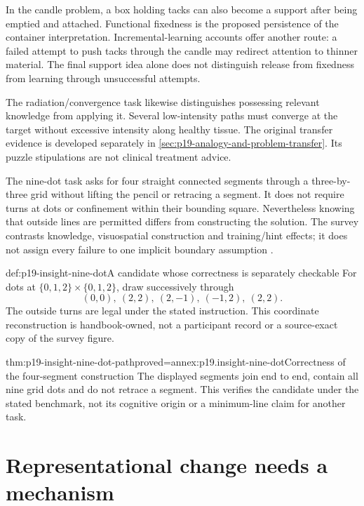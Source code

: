 In the candle problem, a box holding tacks can also become a support after
being emptied and attached. Functional fixedness is the proposed persistence
of the container interpretation. Incremental-learning accounts offer another
route: a failed attempt to push tacks through the candle may redirect attention
to thinner material. The final support idea alone does not distinguish release
from fixedness from learning through unsuccessful attempts.

The radiation/convergence task likewise distinguishes possessing relevant
knowledge from applying it. Several low-intensity paths must converge at the
target without excessive intensity along healthy tissue.
The original transfer evidence is developed separately in
\cref{sec:p19-analogy-and-problem-transfer}.
Its puzzle stipulations are not clinical treatment advice.

The nine-dot task asks for four straight connected segments through a
three-by-three grid without lifting the pencil or retracing a segment.
It does not require turns at dots or confinement within their bounding square.
Nevertheless knowing that outside lines are permitted differs from constructing
the solution. The survey contrasts knowledge, visuospatial construction and
training/hint effects; it does not assign every failure to one implicit
boundary assumption \parencite[pp.~479--480]{VanSteenburghEtAl2012InsightRevises}.

\begin{hbexample}{def:p19-insight-nine-dot}{A candidate whose correctness is separately checkable}
For dots at \(\{0,1,2\}\times\{0,1,2\}\), draw successively through
\[
 (0,0),\ (2,2),\ (2,-1),\ (-1,2),\ (2,2).
\]
The outside turns are legal under the stated instruction.
This coordinate reconstruction is handbook-owned, not a participant record
or a source-exact copy of the survey figure.
\end{hbexample}

\begin{hblemma}{thm:p19-insight-nine-dot-path}{proved=annex:p19.insight-nine-dot}{Correctness of the four-segment construction}
The displayed segments join end to end, contain all nine grid dots and
do not retrace a segment. This verifies the candidate under the stated
benchmark, not its cognitive origin or a minimum-line claim for another task.
\end{hblemma}

\section{Representational change needs a mechanism}
\label{sec:p19-insight-representation-change}

